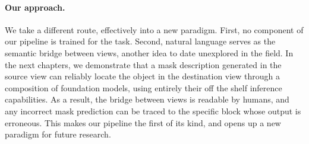 \paragraph{Our approach.} We take a different route, effectively into a new paradigm. First, no component of our  pipeline is trained for the task. Second, natural language serves as the semantic bridge between views, another idea to date unexplored in the field. In the next chapters, we demonstrate that a mask description generated in the source view can reliably locate the object in the destination view through a composition of foundation models, using entirely their off the shelf inference capabilities. As a result, the bridge between views is readable by humans, and any incorrect mask prediction can be traced to the specific block whose output is erroneous. This makes our pipeline the first of its kind, and opens up a new paradigm for future research.